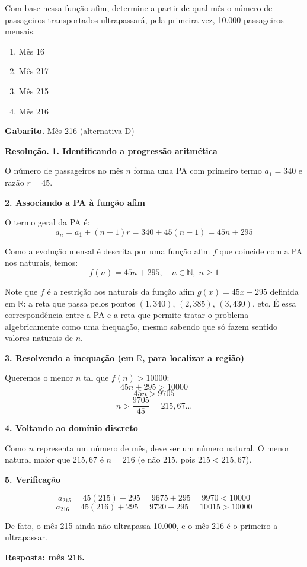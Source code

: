 \documentclass[11pt,a4paper]{article}
\begin{document}
Com base nessa função afim, determine a partir de qual mês o número de passageiros transportados ultrapassará, pela primeira vez, 10.000 passageiros mensais.
\begin{enumerate}[label=(\alph*)]
\item Mês 16
\item Mês 217
\item Mês 215
\item Mês 216
\end{enumerate}

\textbf{Gabarito.} Mês 216 (alternativa D)

\textbf{Resolução.} \textbf{1. Identificando a progressão aritmética}

O número de passageiros no mês $n$ forma uma PA com primeiro termo $a_1 = 340$ e razão $r = 45$.

\textbf{2. Associando a PA à função afim}

O termo geral da PA é:
$$a_n = a_1 + (n-1)r = 340 + 45(n-1) = 45n + 295$$

Como a evolução mensal é descrita por uma função afim $f$ que coincide com a PA nos naturais, temos:
$$f(n) = 45n + 295, \quad n \in \mathbb{N}, \; n \geq 1$$

Note que $f$ é a restrição aos naturais da função afim $g(x) = 45x + 295$ definida em $\mathbb{R}$: a reta que passa pelos pontos $(1,340)$, $(2,385)$, $(3,430)$, etc. É essa correspondência entre a PA e a reta que permite tratar o problema algebricamente como uma inequação, mesmo sabendo que só fazem sentido valores naturais de $n$.

\textbf{3. Resolvendo a inequação (em $\mathbb{R}$, para localizar a região)}

Queremos o menor $n$ tal que $f(n) > 10000$:
$$45n + 295 > 10000$$
$$45n > 9705$$
$$n > \frac{9705}{45} = 215{,}67\ldots$$

\textbf{4. Voltando ao domínio discreto}

Como $n$ representa um número de mês, deve ser um número natural. O menor natural maior que $215{,}67$ é $n = 216$ (e não $215$, pois $215 < 215{,}67$).

\textbf{5. Verificação}

$$a_{215} = 45(215) + 295 = 9675 + 295 = 9970 < 10000$$
$$a_{216} = 45(216) + 295 = 9720 + 295 = 10015 > 10000$$

De fato, o mês 215 ainda não ultrapassa 10.000, e o mês 216 é o primeiro a ultrapassar.

\textbf{Resposta: mês 216.}
\end{document}
